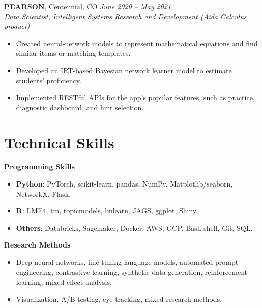 \documentclass[11pt,a4paper]{article}
\begin{document}
\vspace{1ex}

\textbf{PEARSON}, Centennial, CO \hfill \textit{June 2020 -- May 2021} \\
\textit{Data Scientist, Intelligent Systems Research and Development (Aida Calculus product)}
\begin{itemize}
    \item Created neural-network models to represent mathematical equations and find similar items or matching templates.
    \item Developed an IRT-based Bayesian network learner model to estimate students' proficiency.
    \item Implemented RESTful APIs for the app's popular features, such as practice, diagnostic dashboard, and hint selection.
\end{itemize}

\section*{Technical Skills}

\textbf{Programming Skills}
\begin{itemize}
    \item \textbf{Python}: PyTorch, scikit-learn, pandas, NumPy, Matplotlib/seaborn, NetworkX, Flask.
    \item \textbf{R}: LME4, tm, topicmodels, bnlearn, JAGS, ggplot, Shiny.
    \item \textbf{Others}: Databricks, Sagemaker, Docker, AWS, GCP, Bash shell, Git, SQL.
\end{itemize}

\textbf{Research Methods}
\begin{itemize}
    \item Deep neural networks, fine-tuning language models, automated prompt engineering, contrastive learning, synthetic data generation, reinforcement learning, mixed-effect analysis.
    \item Visualization, A/B testing, eye-tracking, mixed research methods.

\end{itemize}
\end{document}
